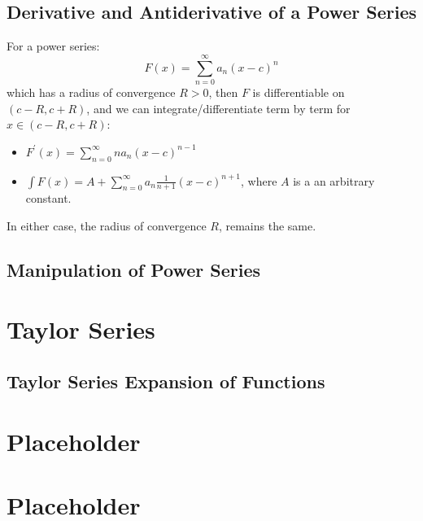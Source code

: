 \documentclass[a4paper]{article}
\begin{document}
  \subsection{Derivative and Antiderivative of a Power Series}
  For a power series:
  \[
    F(x) = \sum_{n=0}^\infty a_n (x-c)^n
  \]
  which has a radius of convergence $R>0$, then $F$ is differentiable on $(c-R, c+R)$, and we can integrate/differentiate term by term for $x \in (c-R,c+R)$:
  \begin{itemize}
    \item $F^\prime (x) = \sum_{n=0}^\infty n a_n(x-c)^{n-1}$
    \item $\int F (x) = A + \sum_{n=0}^\infty a_n \displaystyle\frac{1}{n+1}(x-c)^{n+1}$, where $A$ is a an arbitrary constant.
  \end{itemize}
  In either case, the radius of convergence $R$, remains the same.
  \subsection{Manipulation of Power Series}
  \section{Taylor Series} 
  \subsection{Taylor Series Expansion of Functions}
  \section{Placeholder} 
  \section{Placeholder} 
\end{document}
